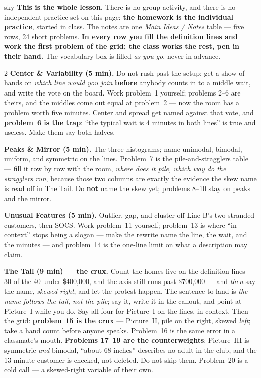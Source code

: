 \documentclass[10pt]{article}
\begin{document}
\boxguard
\begin{skillbox}{sky}
\textbf{This is the whole lesson.} There is no group activity, and there is no independent
practice set on this page: \textbf{the homework is the individual practice}, started in class.
The notes are one \emph{Main Ideas / Notes} table --- five rows, 24 short problems. \textbf{In
every row you fill the definition lines and work the first problem of the grid; the class works
the rest, pen in their hand.} The vocabulary box is filled \emph{as you go}, never in advance.
\begin{multicols}{2}
\textbf{Center \& Variability (5 min).} Do not rush past the setup: get a show of hands on
\emph{which line would you join} \textbf{before} anybody counts in to a middle wait, and write
the vote on the board. Work problem~1 yourself; problems 2--6 are theirs, and the middles come
out equal at problem~2 --- now the room has a problem worth five minutes. Center and spread get
named against that vote, and \textbf{problem~6 is the trap}: ``the typical wait is 4 minutes in
both lines'' is true and useless. Make them say both halves.

\textbf{Peaks \& Mirror (5 min).} The three histograms; name unimodal, bimodal, uniform, and
symmetric on the lines. Problem~7 is the pile-and-stragglers table --- fill it row by row with
the room, \emph{where does it pile, which way do the stragglers run}, because those two columns
are exactly the evidence the skew name is read off in The Tail. Do \textbf{not} name the skew
yet; problems 8--10 stay on peaks and the mirror.

\textbf{Unusual Features (5 min).} Outlier, gap, and cluster off Line B's two stranded
customers, then SOCS. Work problem~11 yourself; problem~13 is where ``in context'' stops being
a slogan --- make the rewrite name the line, the wait, and the minutes --- and problem~14 is
the one-line limit on what a description may claim.

\textbf{The Tail (9 min) --- the crux.} Count the homes live on the definition lines --- 30 of
the 40 under \$400{,}000, and the axis still runs past \$700{,}000 --- and \emph{then} say the
name, \emph{skewed right}, and let the protest happen. The sentence to land is \emph{the name
follows the tail, not the pile}; say it, write it in the callout, and point at Picture~I while
you do. Say all four for Picture~I on the lines, in context. Then the grid: \textbf{problem~15
is the crux} --- Picture~II, pile on the right, skewed \emph{left}; take a hand count before
anyone speaks. Problem~16 is the same error in a classmate's mouth. \textbf{Problems 17--19 are
the counterweights}: Picture~III is symmetric \emph{and} bimodal, ``about 68 inches'' describes
no adult in the club, and the 13-minute customer is checked, not deleted. Do not skip them.
Problem~20 is a cold call --- a skewed-right variable of their own.


\end{multicols}
\end{skillbox}
\end{document}
